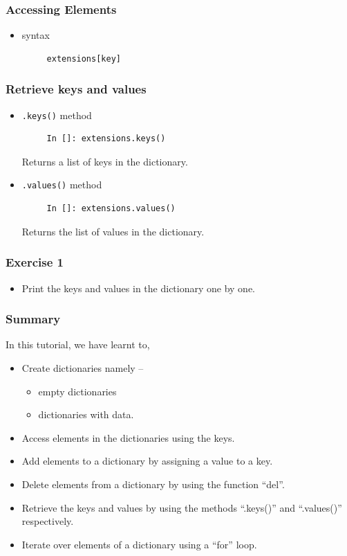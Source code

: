 \documentclass[presentation]{beamer}
\begin{document}
\begin{frame}[fragile]
\frametitle{Accessing Elements}
\label{sec-4}


\begin{itemize}
\item syntax
\begin{verbatim}
     extensions[key]
\end{verbatim}

\end{itemize}
\end{frame}
\begin{frame}[fragile]
\frametitle{Retrieve keys and values}
\label{sec-5}


\begin{itemize}
\item \verb~.keys()~ method
\begin{verbatim}
     In []: extensions.keys()
\end{verbatim}

    Returns a list of keys in the dictionary.
\item \verb~.values()~ method
\begin{verbatim}
     In []: extensions.values()
\end{verbatim}

    Returns the list of values in the dictionary.
\end{itemize}
\end{frame}
\begin{frame}
\frametitle{Exercise 1}
\label{sec-6}

\begin{itemize}
\item Print the keys and values in the dictionary one by one.
\end{itemize}
\end{frame}
\begin{frame}
\frametitle{Summary}
\label{sec-7}

  In this tutorial, we have learnt to,


\begin{itemize}
\item Create dictionaries namely --
\begin{itemize}
\item empty dictionaries
\item dictionaries with data.
\end{itemize}
\item Access elements in the dictionaries using the keys.
\item Add elements to a dictionary by assigning a value to a key.
\item Delete elements from a dictionary by using the function ``del''.
\item Retrieve the keys and values by using the methods ``.keys()'' and 
    ``.values()'' respectively.
\item Iterate over elements of a dictionary using a ``for'' loop.
\end{itemize}
\end{frame}
\end{document}
